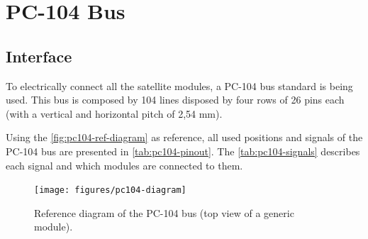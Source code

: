 \section{PC-104 Bus}

\subsection{Interface}

To electrically connect all the satellite modules, a PC-104 bus standard is being used. This bus is composed by 104 lines disposed by four rows of 26 pins each (with a vertical and horizontal pitch of 2,54 mm).

Using the \autoref{fig:pc104-ref-diagram} as reference, all used positions and signals of the PC-104 bus are presented in \autoref{tab:pc104-pinout}. The \autoref{tab:pc104-signals} describes each signal and which modules are connected to them.

\begin{figure}[!ht]
    \begin{center}
        \texttt{[image: figures/pc104-diagram]}
        \caption{Reference diagram of the PC-104 bus (top view of a generic module).}
        \label{fig:pc104-ref-diagram}
    \end{center}
\end{figure}


